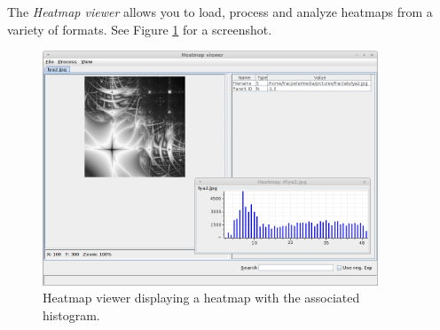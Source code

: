 \documentclass[a4paper]{book}
\begin{document}
The \textit{Heatmap viewer} allows you to load, process and analyze heatmaps
from a variety of formats. See Figure \ref{heatmap-viewer} for a screenshot.
\begin{figure}[htb]
  \centering
  \includegraphics[width=10.0cm]{images/heatmap-viewer.png}
  \caption{Heatmap viewer displaying a heatmap with the associated histogram.}
  \label{heatmap-viewer}
\end{figure}


\end{document}
